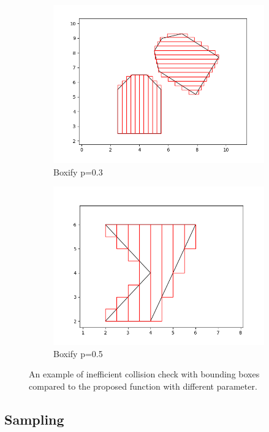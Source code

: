 \documentclass[a4paper,12pt]{article}
\DeclareRobustCommand{\[}{\begin{equation}}
\DeclareRobustCommand{\]}{\end{equation}}
\numberwithin{equation}{section}
\numberwithin{algorithm}{section}
\begin{document}
\begin{figure}[H]
\begin{subfigure}[b]{0.4\textwidth}
        \includegraphics[scale=0.3,width=\textwidth]{images/car_boxify_0_3.png}
        \caption{Boxify p=0.3}
    \end{subfigure}
    \begin{subfigure}[b]{0.4\textwidth}
        \includegraphics[scale=0.3,width=\textwidth]{images/concave_boxify.png}
        \caption{Boxify p=0.5}
    \end{subfigure}
    \captionsetup{width=0.6\textwidth}
    \caption{An example of inefficient collision check with bounding boxes compared to the proposed function with different parameter.}
\end{figure}

\subsection{Sampling}
\end{document}
